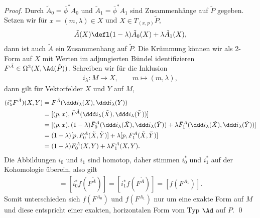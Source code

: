 \documentclass[%
	paper=a5,%
	fleqn,%
	DIV=18,%
	BCOR=0mm,
	fontsize=11pt,
	titlepage=false,%
	bibliography=totoc,
	DIV=18,%
	twoside=true,
	pdftitle=Riemannsche Geometrie,
	pdfauthor=Uwe Semmelmann,
	numbers=noendperiod]%
	{scrbook}
\begin{document}
\begin{proof}
{}

\noindent
Durch $\tilde{A}_0 = \bar{\phi}^*A_0$ und  $\tilde{A}_1 = \bar{\phi}^*A_1$ sind
Zusammenhänge auf $\tilde{P}$ gegeben.
Setzen wir für $x=(m,\lambda)\in X$ und $X\in T_{(x,p)}\tilde{P}$,
\begin{align*}
\tilde{A}(X) \defl (1-\lambda)\tilde{A}_0(X) + \lambda\tilde{A}_1(X),
\end{align*}
dann ist auch $\tilde{A}$ ein Zusammenhang auf $\tilde{P}$. Die Krümmung
 können wir als 2-Form auf $X$ mit Werten im adjungierten Bündel
identifizieren $F^{\tilde{A}}\in\Omega^2(X,\Ad(\tilde{P}))$. Schreiben wir für
die Inklusion
\begin{align*}
i_\lambda\colon M\to X,\qquad m\mapsto (m,\lambda),
\end{align*}
dann gilt für Vektorfelder $X$ und $Y$ auf $M$,
\begin{align*}
(i_\lambda^* F^{\tilde{A}})(X,Y) &= 
F^{\tilde{A}}(\ddd i_\lambda(X),\ddd i_\lambda(Y))\\
&= 
[(p,x),\bar{F}^{\tilde{A}}(\ddd i_\lambda(\tilde{X}),\ddd
i_\lambda(\tilde{Y}))]\\
&= 
[(p,x),(1-\lambda)\bar{F}^A_0(\ddd i_\lambda(\tilde{X}),\ddd
i_\lambda(\tilde{Y})) + 
\lambda \bar{F}^A_1(\ddd i_\lambda(\tilde{X}),\ddd i_\lambda(\tilde{Y}))
]\\
&=
(1-\lambda)[p,\bar{F}^A_0(\tilde{X},\tilde{Y})] +
\lambda[p,\bar{F}^A_1(\tilde{X},\tilde{Y})]\\
&=
(1-\lambda)F^A_0(X,Y) + \lambda F^{A}_1(X,Y).
\end{align*}
Die Abbildungen $i_0$ und $i_1$ sind homotop, daher stimmen $i_0^*$ und $i_1^*$
auf der Kohomologie überein, also gilt
\begin{align*}
[f(F^{A_0})] = [i_0^*f(F^{\tilde{A}})] = [i_1^*f(F^{\tilde{A}})] = 
[f(F^{A_1})].
\end{align*}
Somit unterschieden sich $f(F^{A_0})$ und $f(F^{A_1})$ nur um eine exakte Form
auf $M$ und diese entspricht einer exakten, horizontalen Form vom Typ
$\Ad$ auf $P$.
%
%
%
%
\qed
\end{proof}
\end{document}

